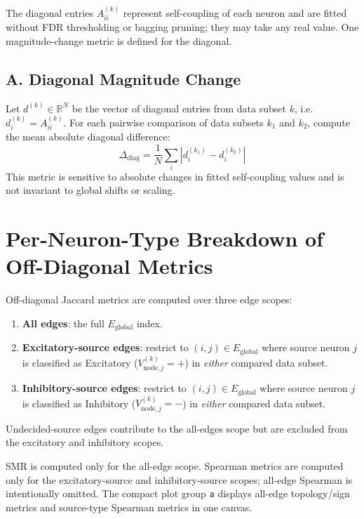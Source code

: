 \documentclass[11pt]{article}
\begin{document}
The diagonal entries $A^{(k)}_{ii}$ represent self-coupling of each neuron and are fitted without FDR thresholding or bagging pruning; they may take any real value. One magnitude-change metric is defined for the diagonal.

\subsection*{A. Diagonal Magnitude Change}

Let $d^{(k)} \in \mathbb{R}^N$ be the vector of diagonal entries from data subset $k$, i.e.\ $d^{(k)}_i = A^{(k)}_{ii}$. For each pairwise comparison of data subsets $k_1$ and $k_2$, compute the mean absolute diagonal difference:
\[
\Delta_{\text{diag}} = \frac{1}{N}\sum_i \left|d^{(k_1)}_i - d^{(k_2)}_i\right|
\]
This metric is sensitive to absolute changes in fitted self-coupling values and is not invariant to global shifts or scaling.

\section{Per-Neuron-Type Breakdown of Off-Diagonal Metrics}
\label{sec:neurontype}

Off-diagonal Jaccard metrics are computed over three edge scopes:
\begin{enumerate}
    \item \textbf{All edges}: the full $E_{\text{global}}$ index.
    \item \textbf{Excitatory-source edges}: restrict to $(i,j) \in E_{\text{global}}$ where source neuron $j$ is classified as Excitatory ($V^{(k)}_{\text{node},j} = +$) in \emph{either} compared data subset.
    \item \textbf{Inhibitory-source edges}: restrict to $(i,j) \in E_{\text{global}}$ where source neuron $j$ is classified as Inhibitory ($V^{(k)}_{\text{node},j} = -$) in \emph{either} compared data subset.
\end{enumerate}
Undecided-source edges contribute to the all-edges scope but are excluded from the excitatory and inhibitory scopes.

SMR is computed only for the all-edge scope. Spearman metrics are computed only for the excitatory-source and inhibitory-source scopes; all-edge Spearman is intentionally omitted. The compact plot group \texttt{a} displays all-edge topology/sign metrics and source-type Spearman metrics in one canvas.
\end{document}
